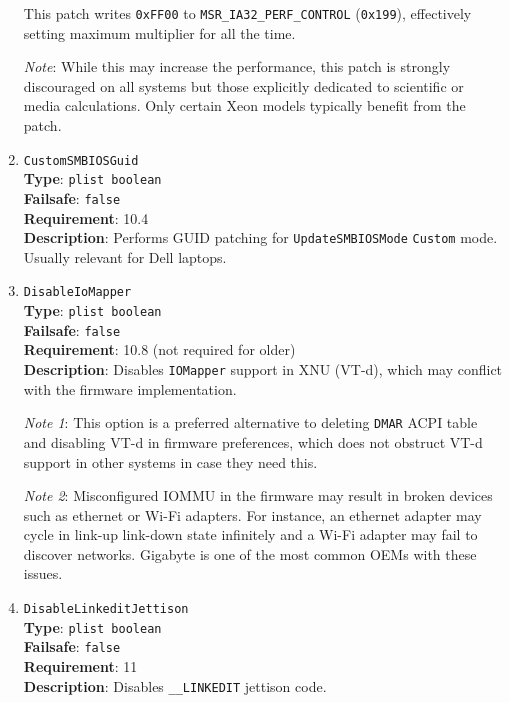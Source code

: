 \documentclass[]{article}
\begin{document}
\begin{enumerate}
  This patch writes \texttt{0xFF00} to \texttt{MSR\_IA32\_PERF\_CONTROL} (\texttt{0x199}),
  effectively setting maximum multiplier for all the time.

  \emph{Note}: While this may increase the performance, this patch is strongly discouraged
  on all systems but those explicitly dedicated to scientific or media calculations.
  Only certain Xeon models typically benefit from the patch.

\item
  \texttt{CustomSMBIOSGuid}\\
  \textbf{Type}: \texttt{plist\ boolean}\\
  \textbf{Failsafe}: \texttt{false}\\
  \textbf{Requirement}: 10.4\\
  \textbf{Description}: Performs GUID patching for \texttt{UpdateSMBIOSMode}
  \texttt{Custom} mode. Usually relevant for Dell laptops.

\item
  \texttt{DisableIoMapper}\\
  \textbf{Type}: \texttt{plist\ boolean}\\
  \textbf{Failsafe}: \texttt{false}\\
  \textbf{Requirement}: 10.8 (not required for older)\\
  \textbf{Description}: Disables \texttt{IOMapper} support in XNU (VT-d),
  which may conflict with the firmware implementation.

  \emph{Note 1}: This option is a preferred alternative to deleting \texttt{DMAR}
  ACPI table and disabling VT-d in firmware preferences, which does not obstruct
  VT-d support in other systems in case they need this.

  \emph{Note 2}: Misconfigured IOMMU in the firmware may result in broken devices
  such as ethernet or Wi-Fi adapters. For instance, an ethernet adapter may cycle in link-up
  link-down state infinitely and a Wi-Fi adapter may fail to discover networks.
  Gigabyte is one of the most common OEMs with these issues.

\item
  \texttt{DisableLinkeditJettison}\\
  \textbf{Type}: \texttt{plist\ boolean}\\
  \textbf{Failsafe}: \texttt{false}\\
  \textbf{Requirement}: 11\\
  \textbf{Description}: Disables \texttt{\_\_LINKEDIT} jettison code.


\end{enumerate}
\end{document}
